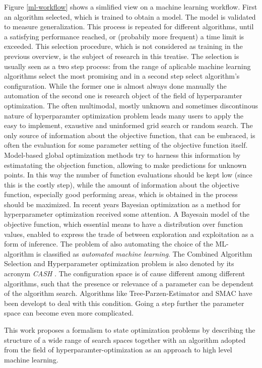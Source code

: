 \documentclass[english]{article}
\begin{document}
Figure \ref{ml-workflow} shows a simlified view on a machine learning workflow. First an algorithm selected, which is trained to obtain a model. The model is validated to measure generalization. This process is repeated for different algorithms, until a satisfying performance reached, or (probabily more frequent) a time limit is exceeded. This selection procedure, which is not considered as training in the previous overview, is the subject of research in this treatise.
The selection is usually seen as a two step process: from the range of aplicable machine learning algorithms select the most promising and in a second step select algorithm's configuration. While the former one is almost always done manually the automation of the second one is research object of the field of hyperparamter optimization.
The often multimodal, mostly unknown and sometimes discontinous nature of hyperparamter optimization problem leads many users to apply the easy to implement, exaustive and uninformed grid search or random search. The only source of information about the objective function, that can be embraced, is often the evaluation for some parameter setting of the objective function itself. Model-based global optimization methods try to harness this information by estimatating the objection function, allowing to make predictions for unknown points. In this way the number of function evaluations should be kept low (since this is the costly step), while the amount of information about the objective function, especially good performing areas, which is obtained in the process should be maximized.
In recent years Bayesian optimization as a method for hyperparameter optimization received some attention. A Bayesain model of the objective function, which essential means to have a distribution over function values, enabled to express the trade of between exploration and exploitation as a form of inference.
The problem of also automating the choice of the ML-algorithm is classified as \textit{automated machine learning}. The Combined Algorithm Selection and Hyperparameter optimization problem is also denoted by its acronym \textit{CASH} \cite{feurer_efficient_2015}. The configuration space is of cause different among different algorithms, such that the presence or relevance of a parameter can be dependent of the algorithm search. Algorithms like Tree-Parzen-Estimator and SMAC have been developt to deal with this condition.
Going a step further the parameter space can become even more complicated. 

This work proposes a formalism to state optimization problems by describing the structure of a wide range of search spaces together with an algorithm adopted from the field of hyperparamter-optimization as an approach to high level machine learning.
\end{document}
